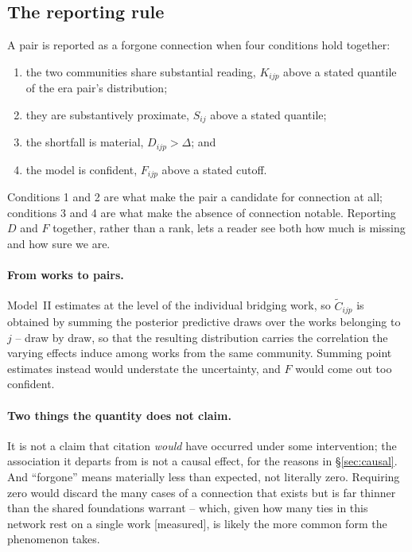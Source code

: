 \documentclass[11pt]{article}
\newcommand{\meas}{{\footnotesize\textsf{[measured]}}}
\begin{document}
\subsection{The reporting rule}

A pair is reported as a forgone connection when four conditions hold together:

\begin{enumerate}[leftmargin=2em, itemsep=1pt]
  \item the two communities share substantial reading, $K_{ijp}$ above a stated quantile of
        the era pair's distribution;
  \item they are substantively proximate, $S_{ij}$ above a stated quantile;
  \item the shortfall is material, $D_{ijp} > \Delta$; and
  \item the model is confident, $F_{ijp}$ above a stated cutoff.
\end{enumerate}

Conditions 1 and 2 are what make the pair a candidate for connection at all; conditions 3 and
4 are what make the absence of connection notable. Reporting $D$ and $F$ together, rather
than a rank, lets a reader see both how much is missing and how sure we are.

\paragraph{From works to pairs.} Model~II estimates at the level of the individual bridging
work, so $\tilde{C}_{ijp}$ is obtained by summing the posterior predictive draws over the
works belonging to $j$ -- draw by draw, so that the resulting distribution carries the
correlation the varying effects induce among works from the same community. Summing point
estimates instead would understate the uncertainty, and $F$ would come out too confident.

\paragraph{Two things the quantity does not claim.} It is not a claim that citation
\emph{would} have occurred under some intervention; the association it departs from is not a
causal effect, for the reasons in \S\ref{sec:causal}. And ``forgone'' means materially less
than expected, not literally zero. Requiring zero would discard the many cases of a
connection that exists but is far thinner than the shared foundations warrant -- which, given
how many ties in this network rest on a single work \meas{}, is likely the more common form
the phenomenon takes.
\end{document}
